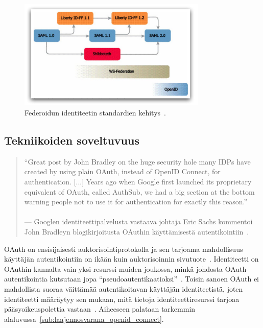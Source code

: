 \documentclass[finnish,gradu]{tktltiki}
\begin{document}
  \begin{figure}
    \centering
    \includegraphics[width=0.8\textwidth]{images/federoidun_id_standardien_kehitys.jpg}
    \caption[Federoidun identiteetin standardien kehitys.]{Federoidun identiteetin standardien kehitys~\cite{ping_identity_primer_federated_id_2010}.}
    \label{fig:federoidun_id_standardien_kehitys}
  \end{figure}


  \newpage
  \subsection{Tekniikoiden soveltuvuus} %
  \label{sub:tekniikoiden_yhtäläisyydet}

  \begin{quote}
    ``Great post by John Bradley on the huge security hole many IDPs have created by using plain OAuth, instead of OpenID Connect, for authentication. [...] Years ago when Google first launched its proprietary equivalent of OAuth, called AuthSub, we had a big section at the bottom warning people not to use it for authentication for exactly this reason.''
    \\
    \\--- Googlen identiteettipalvelusta vastaava johtaja Eric Sachs
     kommentoi~\cite{sachs_comment_on_oauth_authentication_2012}
     John Bradleyn blogikirjoitusta OAuthin käyttämisestä
     autentikointiin~\cite{bradley_oauth_authentication_problem_2012}.
  \end{quote}

  OAuth on ensisijaisesti auktorisointiprotokolla ja sen tarjoama mahdollisuus käyttäjän autentikointiin on ikään kuin auktorisoinnin sivutuote~\cite{bradley_facebook_for_authentication_2012}. Identiteetti on OAuthin kannalta vain yksi resurssi muiden joukossa, minkä johdosta OAuth-autentikointia kutsutaan jopa ``pseudoautentikaatioksi''~\cite{sakimura_dummydiff_oauth_openid_2011}. Toisin sanoen \mbox{OAuth} ei mahdollista suoraa väittämää autentikoitavan käyttäjän identiteetistä, joten identiteetti määräytyy sen mukaan, mitä tietoja identiteettiresurssi tarjoaa pääsyoikeuspolettia vastaan~\cite{bradley_oauth_implicit_flow_vulnerability_2012}. Aiheeseen palataan tarkemmin alaluvussa~\ref{sub:laajennosvarana_openid_connect}.
\end{document}
